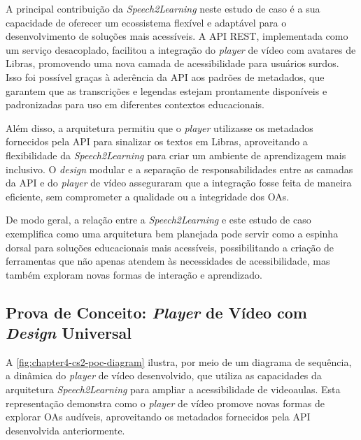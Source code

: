 A principal contribuição da \textit{Speech2Learning} neste estudo de caso é a sua capacidade de oferecer um ecossistema flexível e adaptável para o desenvolvimento de soluções mais acessíveis. A API REST, implementada como um serviço desacoplado, facilitou a integração do \textit{player} de vídeo com avatares de Libras, promovendo uma nova camada de acessibilidade para usuários surdos. Isso foi possível graças à aderência da API aos padrões de metadados, que garantem que as transcrições e legendas estejam prontamente disponíveis e padronizadas para uso em diferentes contextos educacionais.

Além disso, a arquitetura permitiu que o \textit{player} utilizasse os metadados fornecidos pela API para sinalizar os textos em Libras, aproveitando a flexibilidade da \textit{Speech2Learning} para criar um ambiente de aprendizagem mais inclusivo. O \textit{design} modular e a separação de responsabilidades entre as camadas da API e do \textit{player} de vídeo asseguraram que a integração fosse feita de maneira eficiente, sem comprometer a qualidade ou a integridade dos OAs.

De modo geral, a relação entre a \textit{Speech2Learning} e este estudo de caso exemplifica como uma arquitetura bem planejada pode servir como a espinha dorsal para soluções educacionais mais acessíveis, possibilitando a criação de ferramentas que não apenas atendem às necessidades de acessibilidade, mas também exploram novas formas de interação e aprendizado.

\subsection{Prova de Conceito: \textit{Player} de Vídeo com \textit{Design} Universal}

A \autoref{fig:chapter4-cs2-poc-diagram} ilustra, por meio de um diagrama de sequência, a dinâmica do \textit{player} de vídeo desenvolvido, que utiliza as capacidades da arquitetura \textit{Speech2Learning} para ampliar a acessibilidade de videoaulas. Esta representação demonstra como o \textit{player} de vídeo promove novas formas de explorar OAs audíveis, aproveitando os metadados fornecidos pela API desenvolvida anteriormente.

